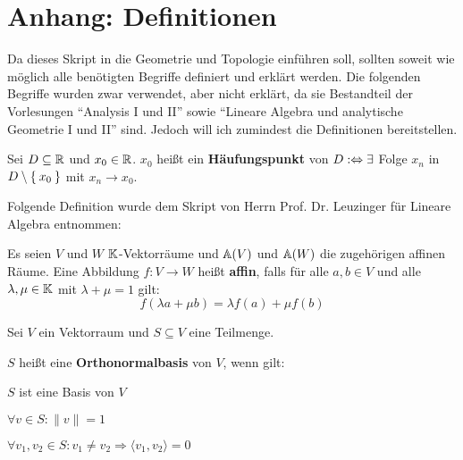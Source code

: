 \chapter*{Anhang: Definitionen}

Da dieses Skript in die Geometrie und Topologie einführen soll, sollten soweit
wie möglich alle benötigten Begriffe definiert und erklärt werden. Die folgenden
Begriffe wurden zwar verwendet, aber nicht erklärt, da sie Bestandteil der
Vorlesungen \enquote{Analysis I und II} sowie \enquote{Lineare Algebra und analytische Geometrie I und II}
sind. Jedoch will ich zumindest die Definitionen bereitstellen.

\begin{definition}
	Sei $D \subseteq \mathbb{R}$ und $x_0 \in \mathbb{R}$. $x_0$ heißt ein \textbf{Häufungspunkt}
	von $D :\Leftrightarrow \exists$ Folge $x_n$ in $D \setminus \Set{x_0}$ mit $x_n \rightarrow x_0$.
\end{definition}

Folgende Definition wurde dem Skript von Herrn Prof. Dr. Leuzinger für
Lineare Algebra entnommen:

\begin{definition}
	Es seien $V$ und $W$ $\mathbb{K}$-Vektorräume und $\mathbb{A}(V)$ und $\mathbb{A}(W)$ die 
	zugehörigen affinen Räume. Eine Abbildung $f:V \rightarrow W$ heißt \textbf{affin},
	falls für alle $a, b \in V$ und alle $\lambda, \mu \in \mathbb{K}$ mit $\lambda + \mu = 1$ gilt:
	\[f(\lambda a + \mu b) = \lambda f(a) + \mu f(b)\]
\end{definition}

\begin{definition}
	Sei $V$ ein Vektorraum und $S \subseteq V$ eine Teilmenge.

	$S$ heißt eine \textbf{Orthonormalbasis} von $V$, wenn gilt:
	\begin{defenumprops}
		\item $S$ ist eine Basis von $V$
		\item $\forall v \in S: \|v\| = 1$
		\item $\forall v_1, v_2 \in S: v_1 \neq v_2 \Rightarrow \langle v_1, v_2 \rangle = 0$
	\end{defenumprops}
\end{definition}